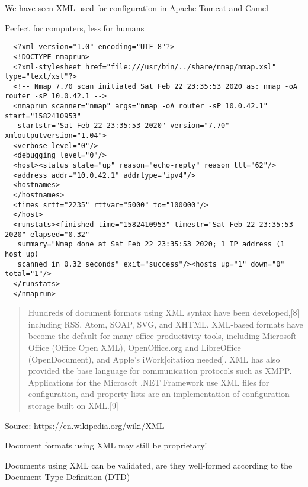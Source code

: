 \documentclass[Screen16to9,17pt]{foils}
\begin{document}
\begin{list2}
\item We have seen XML used for configuration in Apache Tomcat and Camel
\item Perfect for computers, less for humans
\end{list2}


\begin{verbatim}
  <?xml version="1.0" encoding="UTF-8"?>
  <!DOCTYPE nmaprun>
  <?xml-stylesheet href="file:///usr/bin/../share/nmap/nmap.xsl" type="text/xsl"?>
  <!-- Nmap 7.70 scan initiated Sat Feb 22 23:35:53 2020 as: nmap -oA router -sP 10.0.42.1 -->
  <nmaprun scanner="nmap" args="nmap -oA router -sP 10.0.42.1" start="1582410953"
   startstr="Sat Feb 22 23:35:53 2020" version="7.70" xmloutputversion="1.04">
  <verbose level="0"/>
  <debugging level="0"/>
  <host><status state="up" reason="echo-reply" reason_ttl="62"/>
  <address addr="10.0.42.1" addrtype="ipv4"/>
  <hostnames>
  </hostnames>
  <times srtt="2235" rttvar="5000" to="100000"/>
  </host>
  <runstats><finished time="1582410953" timestr="Sat Feb 22 23:35:53 2020" elapsed="0.32"
   summary="Nmap done at Sat Feb 22 23:35:53 2020; 1 IP address (1 host up)
   scanned in 0.32 seconds" exit="success"/><hosts up="1" down="0" total="1"/>
  </runstats>
  </nmaprun>
\end{verbatim}



\begin{quote}
Hundreds of document formats using XML syntax have been developed,[8] including RSS, Atom, SOAP, SVG, and XHTML. XML-based formats have become the default for many office-productivity tools, including Microsoft Office (Office Open XML), OpenOffice.org and LibreOffice (OpenDocument), and Apple's iWork[citation needed]. XML has also provided the base language for communication protocols such as XMPP. Applications for the Microsoft .NET Framework use XML files for configuration, and property lists are an implementation of configuration storage built on XML.[9]
\end{quote}
Source: \url{https://en.wikipedia.org/wiki/XML}

\begin{list2}
\item Document formats using XML may still be proprietary!
\item Documents using XML can be validated, are they well-formed according to the Document Type Definition (DTD)
\end{list2}
\end{document}
